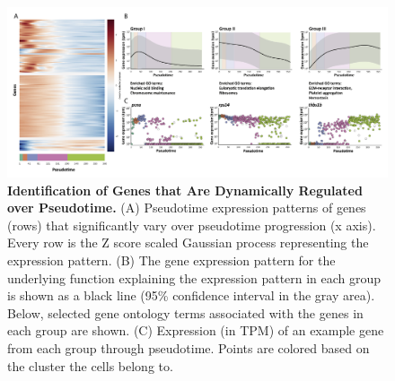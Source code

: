 \begin{figure}
    \centering
    \includegraphics[width=\textwidth]{"Figure6"}
    \caption[Identification of Genes that Are Dynamically Regulated over Pseudotime]{\textbf{Identification of Genes that Are Dynamically Regulated over Pseudotime.} (A)	Pseudotime expression patterns of genes (rows) that significantly vary over pseudotime progression (x axis). Every row is the Z score scaled Gaussian process representing the expression pattern. (B)	The gene expression pattern for the underlying function explaining the expression pattern in each group is shown as a black line (95\% confidence interval in the gray area). Below, selected gene ontology terms associated with the genes in each group are shown. (C)	Expression (in TPM) of an example gene from each group through pseudotime. Points are colored based on the cluster the cells belong to.}
    \label{fig:mohgp}
\end{figure}

